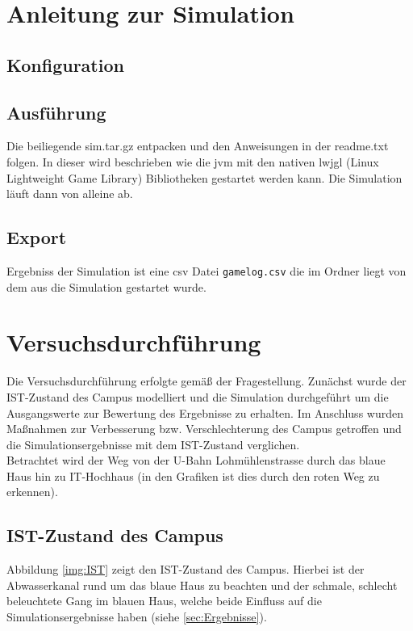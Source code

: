 \documentclass[10pt]{scrartcl}
\author{André Harms, Oliver Steenbuck, Armin Steudte  \\ Carsten Noetzel, Dennis Blauhut, Torben Becker}
\title{\titletext}
\date{11.01.2012}
\begin{document}
\maketitle

\setcounter{tocdepth}{3}
\tableofcontents

	\listoftables                                 												%
	\listoffigures   

\section{Anleitung zur Simulation}
\subsection{Konfiguration}
\subsection{Ausführung}
Die beiliegende sim.tar.gz entpacken und den Anweisungen in der readme.txt folgen.
In dieser wird beschrieben wie die jvm mit den nativen lwjgl (Linux Lightweight Game Library) Bibliotheken gestartet werden kann. Die Simulation läuft dann von alleine ab.
\subsection{Export}
Ergebniss der Simulation ist eine csv Datei \verb!gamelog.csv! die im Ordner liegt von dem aus die Simulation gestartet wurde.

\section{Versuchsdurchführung}
Die Versuchsdurchführung erfolgte gemäß der Fragestellung. Zunächst wurde der IST-Zustand des Campus modelliert und die Simulation durchgeführt um die Ausgangswerte zur Bewertung des Ergebnisse zu erhalten. Im Anschluss wurden Maßnahmen zur Verbesserung bzw. Verschlechterung des Campus getroffen und die Simulationsergebnisse mit dem IST-Zustand verglichen.\\
Betrachtet wird der Weg von der U-Bahn Lohmühlenstrasse durch das blaue Haus hin zu IT-Hochhaus (in den Grafiken ist dies durch den roten Weg zu erkennen).

\subsection{IST-Zustand des Campus}
Abbildung \ref{img:IST} zeigt den IST-Zustand des Campus. Hierbei ist der Abwasserkanal rund um das blaue Haus zu beachten und der schmale, schlecht beleuchtete Gang im blauen Haus, welche beide Einfluss auf die Simulationsergebnisse haben (siehe \ref{sec:Ergebnisse}).
\end{document}
